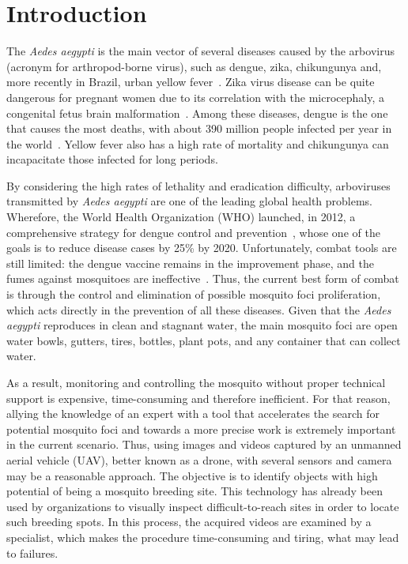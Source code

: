 \chapter{Introduction}
\label{chap:intro}

The \emph{Aedes aegypti} is the main vector of several diseases caused by the arbovirus (acronym for arthropod-borne virus), such as dengue, zika, chikungunya and, more recently in Brazil, urban yellow fever~\cite{ruckert2017, web:MSyellowfever}.
Zika virus disease can be quite dangerous for pregnant women due to its correlation with the microcephaly, a congenital fetus brain malformation~\cite{petersen2016zika, web:who2016zika}.
Among these diseases, dengue is the one that causes the most deaths, with about 390 million people infected per year in the world~\cite{bhatt2013global}.
Yellow fever also has a high rate of mortality and chikungunya can incapacitate those infected for long periods.

By considering the high rates of lethality and eradication difficulty, arboviruses transmitted by \emph{Aedes aegypti} are one of the leading global health problems.
Wherefore, the World Health Organization (WHO) launched, in 2012, a comprehensive strategy for dengue control and prevention~\cite{world2012global}, whose one of the goals is to reduce disease cases by 25\% by 2020.
Unfortunately, combat tools are still limited: the dengue vaccine remains in the improvement phase, and the fumes against mosquitoes are ineffective~\cite{newton1992model}.
Thus, the current best form of combat is through the control and elimination of possible mosquito foci proliferation, which acts directly in the prevention of all these diseases.
Given that the \emph{Aedes aegypti} reproduces in clean and stagnant water, the main mosquito foci are open water bowls, gutters, tires, bottles, plant pots, and any container that can collect water.


As a result, monitoring and controlling the mosquito without proper technical support is expensive, time-consuming and therefore inefficient.
For that reason, allying the knowledge of an expert with a tool that accelerates the search for potential mosquito foci and towards a more precise work is extremely important in the current scenario.
Thus, using images and videos captured by an unmanned aerial vehicle (UAV), better known as a drone, with several sensors and camera may be a reasonable approach.
The objective is to identify objects with high potential of being a mosquito breeding site.
This technology has already been used by organizations to visually inspect difficult-to-reach sites in order to locate such breeding spots.
In this process, the acquired videos are examined by a specialist, which makes the procedure time-consuming and tiring, what may lead to failures.

